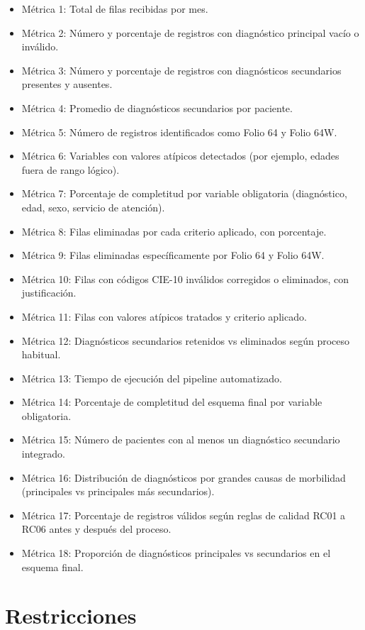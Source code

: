 \documentclass[12pt]{article}
\begin{document}
\begin{itemize}
    \item Métrica 1: Total de filas recibidas por mes.
    \item Métrica 2: Número y porcentaje de registros con diagnóstico principal vacío o inválido.
    \item Métrica 3: Número y porcentaje de registros con diagnósticos secundarios presentes y ausentes.
    \item Métrica 4: Promedio de diagnósticos secundarios por paciente.
    \item Métrica 5: Número de registros identificados como Folio 64 y Folio 64W.
    \item Métrica 6: Variables con valores atípicos detectados (por ejemplo, edades fuera de rango lógico).
    \item Métrica 7: Porcentaje de completitud por variable obligatoria (diagnóstico, edad, sexo, servicio de atención).
    \item Métrica 8: Filas eliminadas por cada criterio aplicado, con porcentaje.
    \item Métrica 9: Filas eliminadas específicamente por Folio 64 y Folio 64W.
    \item Métrica 10: Filas con códigos CIE-10 inválidos corregidos o eliminados, con justificación.
    \item Métrica 11: Filas con valores atípicos tratados y criterio aplicado.
    \item Métrica 12: Diagnósticos secundarios retenidos vs eliminados según proceso habitual.
    \item Métrica 13: Tiempo de ejecución del pipeline automatizado.
    \item Métrica 14: Porcentaje de completitud del esquema final por variable obligatoria.
    \item Métrica 15: Número de pacientes con al menos un diagnóstico secundario integrado.
    \item Métrica 16: Distribución de diagnósticos por grandes causas de morbilidad (principales vs principales más secundarios).
    \item Métrica 17: Porcentaje de registros válidos según reglas de calidad RC01 a RC06 antes y después del proceso.
    \item Métrica 18: Proporción de diagnósticos principales vs secundarios en el esquema final.
\end{itemize}

\section*{Restricciones}
\end{document}
